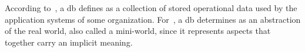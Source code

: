According to~\cite{Date:1990}, a \ac{db} defines as a collection of stored operational data used by the application systems of some organization.
For~\cite{Elmasri:2011}, a \ac{db} determines as an abstraction of the real world, also called a mini-world, since it represents aspects that together carry an implicit meaning.


